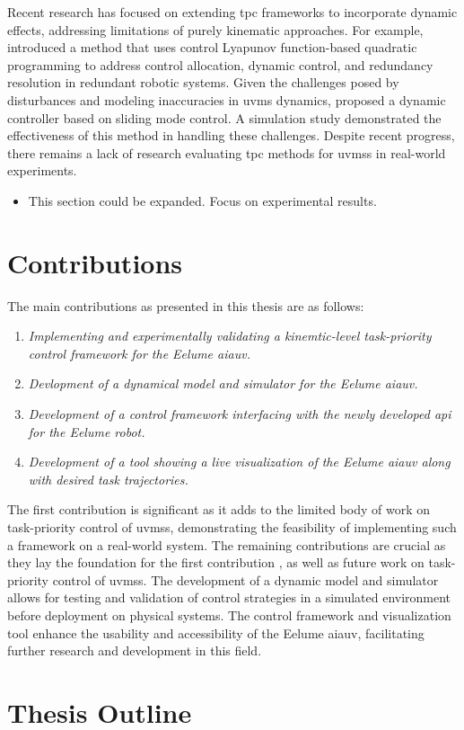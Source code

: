 Recent research has focused on extending \gls{tpc} frameworks to incorporate
dynamic effects, addressing limitations of purely kinematic approaches.
For example, \cite{basso2020} introduced a method that uses control 
Lyapunov function-based quadratic programming to address control allocation, 
dynamic control, and redundancy resolution in redundant robotic systems. Given 
the challenges posed by disturbances and modeling inaccuracies in \gls{uvms} 
dynamics, \cite{iversflaten2022} proposed a dynamic controller based on sliding 
mode control. A simulation study demonstrated the effectiveness of this method 
in handling these challenges.
Despite recent progress, there remains a lack of research evaluating \gls{tpc}
methods for \gls{uvms}s in real-world experiments.

{
\color{red}
\begin{itemize}
    \item This section could be expanded. Focus on experimental results.
\end{itemize}
}

\section{Contributions}

The main contributions as presented in this thesis are as follows:
\begin{enumerate}
    \item \emph{Implementing and experimentally validating a kinemtic-level task-priority control framework for the Eelume \gls{aiauv}.}
    \item \emph{Devlopment of a dynamical model and simulator for the Eelume \gls{aiauv}.}
    \item \emph{Development of a control framework interfacing with the newly developed \gls{api} for the Eelume robot.}
    \item \emph{Development of a tool showing a live visualization of the Eelume \gls{aiauv} along with desired task trajectories.}
\end{enumerate}

The first contribution is significant as it adds to the limited body of work 
on task-priority control of \gls{uvms}s, demonstrating the feasibility of 
implementing such a framework on a real-world system. The remaining 
contributions are crucial as they lay the foundation for the first contribution
, as well as future work on task-priority control of \gls{uvms}s. The 
development of a dynamic model and simulator allows for testing and validation 
of control strategies in a simulated environment before deployment on physical 
systems. The control framework and visualization tool enhance the usability 
and accessibility of the Eelume \gls{aiauv}, facilitating further research and 
development in this field.

\section{Thesis Outline}

